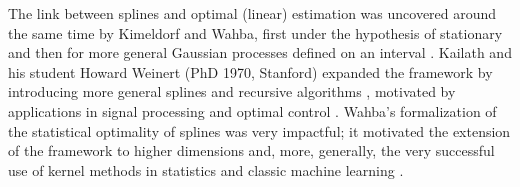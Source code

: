 \documentclass[11pt, english,english]{article}
\renewcommand{\[}{\begin{equation}}
\renewcommand{\]}[1]{\label{eq:#1}\end{equation}}
\begin{document}
The link between splines and optimal (linear) estimation was uncovered around the same time by Kimeldorf and Wahba, first under the hypothesis of stationary \cite{Kimeldorf1970} and then for more general Gaussian processes defined on an interval  \cite{Kimeldorf1971}.
Kailath and his student Howard Weinert (PhD 1970, Stanford) expanded the framework by introducing more general splines and recursive algorithms \cite{Weinert1974}, motivated by applications in signal processing and optimal control \cite{Weinert1976}.
Wahba's formalization of the statistical optimality of splines was very impactful; it motivated the extension of the framework to higher dimensions \cite{Wahba1990, Myers1992} and, more, generally, the very successful use of kernel methods in statistics and classic machine learning \cite{Berlinet2004,Hofmann2008}. 
\end{document}
